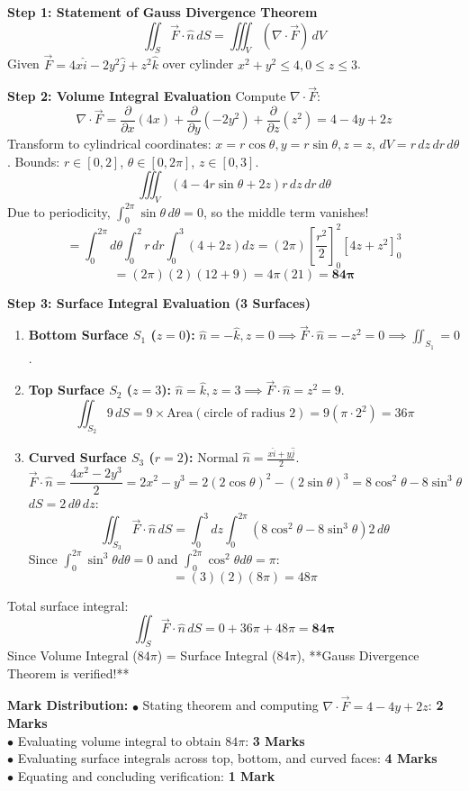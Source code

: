 \begin{solutionbox}
\textbf{Step 1: Statement of Gauss Divergence Theorem}
\[
\iint_S \vec{F} \cdot \hat{n} \, dS = \iiint_V (\nabla \cdot \vec{F}) \, dV
\]
Given $\vec{F} = 4x\hat{i} - 2y^2\hat{j} + z^2\hat{k}$ over cylinder $x^2 + y^2 \le 4, 0 \le z \le 3$.

\textbf{Step 2: Volume Integral Evaluation}
Compute $\nabla \cdot \vec{F}$:
\[
\nabla \cdot \vec{F} = \frac{\partial}{\partial x}(4x) + \frac{\partial}{\partial y}(-2y^2) + \frac{\partial}{\partial z}(z^2) = 4 - 4y + 2z
\]
Transform to cylindrical coordinates: $x = r\cos\theta, y = r\sin\theta, z = z$, $dV = r \, dz \, dr \, d\theta$.
Bounds: $r \in [0, 2]$, $\theta \in [0, 2\pi]$, $z \in [0, 3]$.
\[
\iiint_V (4 - 4r\sin\theta + 2z) r \, dz \, dr \, d\theta
\]
Due to periodicity, $\int_0^{2\pi} \sin\theta \, d\theta = 0$, so the middle term vanishes!
\[
= \int_0^{2\pi} d\theta \int_0^2 r \, dr \int_0^3 (4 + 2z) dz = (2\pi) \left[ \frac{r^2}{2} \right]_0^2 \left[ 4z + z^2 \right]_0^3
\]
\[
= (2\pi)(2)(12 + 9) = 4\pi (21) = \mathbf{84\pi}
\]

\textbf{Step 3: Surface Integral Evaluation (3 Surfaces)}
\begin{enumerate}[label=(\roman*)]
    \item \textbf{Bottom Surface $S_1$ ($z = 0$):} $\hat{n} = -\hat{k}, z = 0 \implies \vec{F} \cdot \hat{n} = -z^2 = 0 \implies \iint_{S_1} = 0$.
    \item \textbf{Top Surface $S_2$ ($z = 3$):} $\hat{n} = \hat{k}, z = 3 \implies \vec{F} \cdot \hat{n} = z^2 = 9$.
    \[
    \iint_{S_2} 9 \, dS = 9 \times \text{Area}(\text{circle of radius 2}) = 9(\pi \cdot 2^2) = 36\pi
    \]
    \item \textbf{Curved Surface $S_3$ ($r = 2$):}
    Normal $\hat{n} = \frac{x\hat{i} + y\hat{j}}{2}$.
    \[
    \vec{F} \cdot \hat{n} = \frac{4x^2 - 2y^3}{2} = 2x^2 - y^3 = 2(2\cos\theta)^2 - (2\sin\theta)^3 = 8\cos^2\theta - 8\sin^3\theta
    \]
    $dS = 2 \, d\theta \, dz$:
    \[
    \iint_{S_3} \vec{F} \cdot \hat{n} \, dS = \int_0^3 dz \int_0^{2\pi} (8\cos^2\theta - 8\sin^3\theta) 2 \, d\theta
    \]
    Since $\int_0^{2\pi} \sin^3\theta d\theta = 0$ and $\int_0^{2\pi} \cos^2\theta d\theta = \pi$:
    \[
    = (3)(2)(8\pi) = 48\pi
    \]
\end{enumerate}
Total surface integral:
\[
\iint_S \vec{F} \cdot \hat{n} \, dS = 0 + 36\pi + 48\pi = \mathbf{84\pi}
\]
Since Volume Integral ($84\pi$) = Surface Integral ($84\pi$), **Gauss Divergence Theorem is verified!**

\begin{markingrubric}
\textbf{Mark Distribution:}
$\bullet$ Stating theorem and computing $\nabla \cdot \vec{F} = 4 - 4y + 2z$: \textbf{2 Marks}\\
$\bullet$ Evaluating volume integral to obtain $84\pi$: \textbf{3 Marks}\\
$\bullet$ Evaluating surface integrals across top, bottom, and curved faces: \textbf{4 Marks}\\
$\bullet$ Equating and concluding verification: \textbf{1 Mark}
\end{markingrubric}
\end{solutionbox}

\newpage

